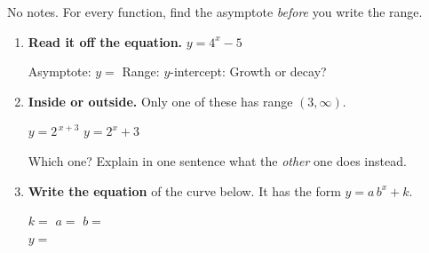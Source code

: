 \documentclass[10pt]{article}
\newcommand{\lgrid}[4]{%
  \draw[step=1, linegray!40, very thin] (#1,#3) grid (#2,#4);
  \draw[->, semithick, charcoal] (#1,0)--(#2,0) node[below right, font=\scriptsize]{$x$};
  \draw[->, semithick, charcoal] (0,#3)--(0,#4) node[left, font=\scriptsize]{$y$};}
\newcommand{\expgraph}[6]{\draw[very thick, forest, domain=#5:#6, samples=140, smooth]
  plot (\x,{(#1)*exp((#2)*((\x)-(#3)))+(#4)});}
\newcommand{\hasym}[3]{\draw[navy, dashed, semithick] (#1,#3)--(#2,#3);}
\begin{document}
\namedateperiod

\vspace{0.08in}

No notes. For every function, find the asymptote \emph{before} you write the range.

\begin{enumerate}[leftmargin=1.8em, itemsep=9pt]
  \item \textbf{Read it off the equation.} \; $y=4^{x}-5$

        \vspace{3pt}
        Asymptote: $y=$ \blank{1.6cm} \quad Range: \blank{2.4cm} \quad
        $y$-intercept: \blank{2.0cm} \quad Growth or decay? \blank{2.0cm}

  \item \textbf{Inside or outside.} Only one of these has range $(3,\infty)$.

        \vspace{3pt}
        \hspace*{1.2em} $y=2^{\,x+3}$ \qquad\qquad $y=2^{x}+3$

        \vspace{3pt}
        Which one? \blank{3.0cm} \; Explain in one sentence what the \emph{other} one does instead.

        \vspace{2pt}
        \writeline

  \item \textbf{Write the equation} of the curve below. It has the form $y=a\,b^{x}+k$.
    \begin{center}
    \begin{minipage}[c]{0.44\linewidth}
    \centering
    \end{minipage}
    \begin{minipage}[c]{0.52\linewidth}
    $k=$ \blank{1.4cm} \quad $a=$ \blank{1.4cm} \quad $b=$ \blank{1.4cm} \\[8pt]
    $y=$ \blank{3.4cm}
    \end{minipage}
    \end{center}


\end{enumerate}
\end{document}

